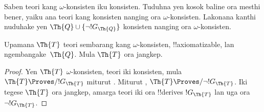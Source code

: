 \documentclass[../../../include/open-logic-section]{subfiles}
\begin{document}
\begin{prob}
  Saben teori kang $\omega$-konsisten iku konsisten. Tuduhna yen
  kosok baline ora mesthi bener, yaiku ana teori kang konsisten
  nanging ora $\omega$-konsisten. Lakonana kanthi nuduhake yen
  $\Th{Q} \cup \{\lnot !G_\Th{Q}\}$ konsisten nanging ora
  $\omega$-konsisten.
\end{prob}

\begin{thm}
 Upamana $\Th{T}$ teori sembarang
kang $\omega$-konsisten, !!{axiomatizable}, lan
ngembangake~$\Th{Q}$. Mula $\Th{T}$ ora jangkep.
\end{thm}

\begin{proof}
  Yen $\Th{T}$ $\omega$-konsisten, teori iki konsisten, mula
  $\Th{T} \Proves/ !G_\Th{T}$ miturut .
  Miturut ,
  $\Th{T} \Proves/ \lnot !G_\Th{T}$. Iki tegese $\Th{T}$ ora
  jangkep, amarga teori iki ora !!{derive}s $!G_\Th{T}$ lan uga ora
  $\lnot !G_\Th{T}$.
\end{proof}
\end{document}
